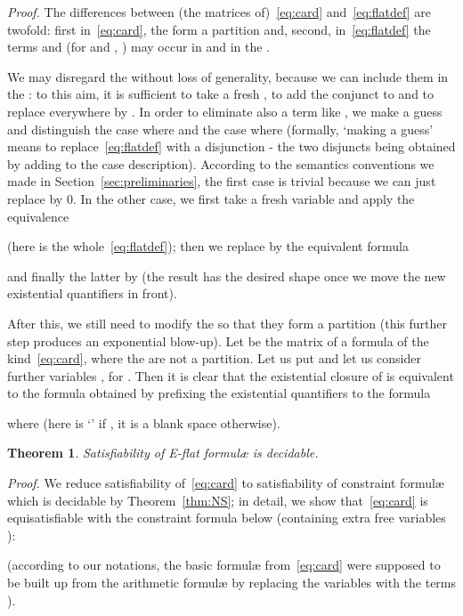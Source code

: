 \documentclass[11pt,a4paper]{article}
\newcommand{\formulae}{formul\ae\xspace}
\newtheorem{theorem}{Theorem}
\begin{document}
\noindent
\textit{Proof.} The differences between (the matrices of)~\eqref{eq:card} and~\eqref{eq:flatdef} are twofold: first in~\eqref{eq:card}, the  form a partition and, second, in~\eqref{eq:flatdef} the terms  and  
(for  and , ) may occur in  
and in the .

We may disregard the  without loss of generality, because we can include them in the : to this aim, it is sufficient to take a fresh , to add
the conjunct  to  and to replace everywhere  by .
  In order 
to  eliminate also a term like , we make a guess and distinguish 
the case where  and the case where  (formally, `making a guess' means to replace~\eqref{eq:flatdef} with a disjunction - the two disjuncts being obtained by adding to  the case description). According to the semantics conventions we made in Section~\ref{sec:preliminaries}, the first case is trivial
because we can just replace  by 0. In the other case, we
first take  a fresh variable  and apply  
 the equivalence

(here  is the whole~\eqref{eq:flatdef});  then we replace  by the equivalent formula 
 
and 
finally the latter by  
 (the result has the desired shape once we move the new existential  quantifiers in front).
 
 
After this, we still need to modify the  so that they form a
 partition (this further step produces an exponential blow-up). Let   be the matrix of a formula of the kind~\eqref{eq:card}, where the  are 
 not a partition. Let us put  and let us consider further variables , for .
 Then it is clear that the existential closure of  is equivalent to the formula obtained by prefixing the existential quantifiers  to the  formula
 
where  (here  is `' if , it is 
a blank space otherwise).



\begin{theorem}\label{thm:main}
 Satisfiability of E-flat  \formulae is decidable.
\end{theorem}

\noindent
\textit{Proof.} 
 We reduce satisfiability of~\eqref{eq:card} to satisfiability of constraint \formulae
which is decidable by Theorem~\ref{thm:NS}; in detail,
 we show that~\eqref{eq:card} is equisatisfiable with 
the constraint formula below (containing extra free variables ):

(according to our notations, the basic \formulae
 from~\eqref{eq:card} 
were supposed to be built up from the arithmetic \formulae  by replacing the variables  with 
the terms ). 
\end{document}

